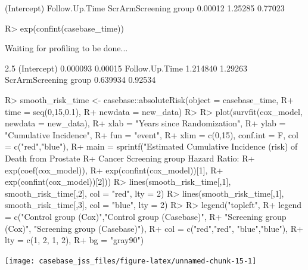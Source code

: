 \documentclass[article]{jss}
\begin{document}
\begin{CodeChunk}
\begin{CodeOutput}
          (Intercept)        Follow.Up.Time ScrArmScreening group 
              0.00012               1.25285               0.77023 
\end{CodeOutput}

\begin{CodeInput}
R> exp(confint(casebase_time))
\end{CodeInput}

\begin{CodeOutput}
Waiting for profiling to be done...
\end{CodeOutput}

\begin{CodeOutput}
                         2.5 %
(Intercept)           0.000093 0.00015
Follow.Up.Time        1.214840 1.29263
ScrArmScreening group 0.639934 0.92534
\end{CodeOutput}
\end{CodeChunk}

\begin{CodeChunk}

\begin{CodeInput}
R> smooth_risk_time <- casebase::absoluteRisk(object = casebase_time, 
R+                                           time = seq(0,15,0.1), 
R+                                           newdata = new_data)
R> 
R> plot(survfit(cox_model, newdata = new_data),
R+      xlab = "Years since Randomization", 
R+      ylab = "Cumulative Incidence", 
R+      fun = "event",
R+      xlim = c(0,15), conf.int = F, col = c("red","blue"), 
R+      main = sprintf("Estimated Cumulative Incidence (risk) of Death from Prostate 
R+                     Cancer Screening group Hazard Ratio: %
R+                     exp(coef(cox_model)), 
R+                     exp(confint(cox_model))[1], 
R+                     exp(confint(cox_model))[2]))
R> lines(smooth_risk_time[,1], smooth_risk_time[,2], col = "red", lty = 2)
R> lines(smooth_risk_time[,1], smooth_risk_time[,3], col = "blue", lty = 2)
R> 
R> legend("topleft", 
R+        legend = c("Control group (Cox)","Control group (Casebase)",
R+                   "Screening group (Cox)", "Screening group (Casebase)"), 
R+        col = c("red","red", "blue","blue"),
R+        lty = c(1, 2, 1, 2), 
R+        bg = "gray90")
\end{CodeInput}


\begin{center}\texttt{[image: casebase\_jss\_files/figure-latex/unnamed-chunk-15-1]} \end{center}

\end{CodeChunk}
\end{document}
